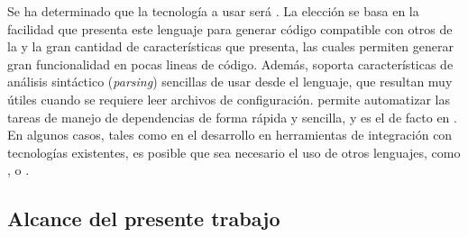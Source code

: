 Se ha determinado que la tecnología a usar será \scala. La elección se basa en la
facilidad que presenta este lenguaje para generar código compatible con otros de la
\jvm y la gran cantidad de características que presenta, las cuales permiten generar
gran funcionalidad en pocas lineas de código. Además, \scala soporta características
de análisis sintáctico (\emph{parsing}) sencillas de usar desde el lenguaje, que
resultan muy útiles cuando se requiere leer archivos de configuración. \sbt permite
automatizar las tareas de manejo de dependencias de forma rápida y sencilla, y es el
\depmgr de facto en \scala.\\
En algunos casos, tales como en el desarrollo en herramientas de integración con
tecnologías existentes, es posible que sea necesario el uso de otros lenguajes,
como \java, \clojure o \groovy.

\subsection{Alcance del presente trabajo}


